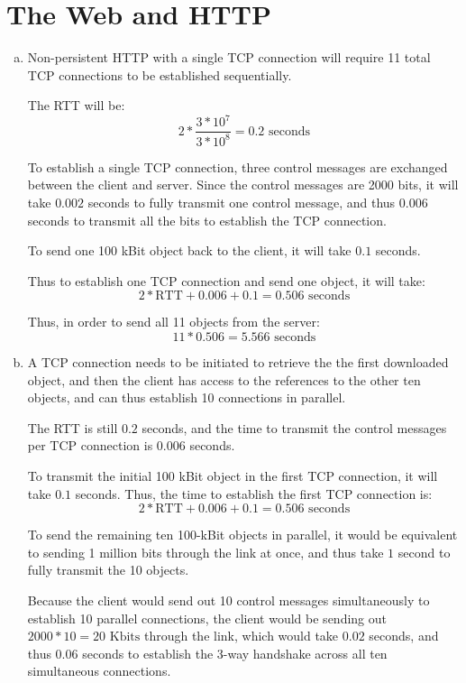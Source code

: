 \documentclass[11pt]{article}
\begin{document}
\section*{The Web and HTTP}
  \begin{enumerate}[(a)]
    \item
      Non-persistent HTTP with a single TCP connection will require 11 total
      TCP connections to be established sequentially.

      The RTT will be:
      \[ 2 * \frac{3 * 10^7}{3 * 10^8} = 0.2 \text{ seconds} \]

      To establish a single TCP connection, three control messages are exchanged
      between the client and server. Since the control messages are 2000 bits,
      it will take $0.002$ seconds to fully transmit one control message, and thus
      $0.006$ seconds to transmit all the bits to establish the TCP connection.

      To send one 100 kBit object back to the client, it will take $0.1$ seconds.

      Thus to establish one TCP connection and send one object, it will take:
      \[ 2 * \text{RTT} + 0.006 + 0.1 = 0.506 \text{ seconds} \]

      Thus, in order to send all 11 objects from the server:
      \[ 11 * 0.506 = \boxed{5.566 \text{ seconds}} \]
    \item
      A TCP connection needs to be initiated to retrieve the the first downloaded
      object, and then the client has access to the references to the other ten
      objects, and can thus establish 10 connections in parallel.

      The RTT is still $0.2$ seconds, and the time to transmit the control messages
      per TCP connection is $0.006$ seconds.

      To transmit the initial 100 kBit object in the first TCP connection, it will take
      $0.1$ seconds. Thus, the time to establish the first TCP connection is:
      \[ 2 * \text{RTT} + 0.006 + 0.1 = 0.506 \text{ seconds} \]

      To send the remaining ten 100-kBit objects in parallel, it would be equivalent
      to sending 1 million bits through the link at once, and thus take $1$ second
      to fully transmit the 10 objects.

      Because the client would send out 10 control messages simultaneously to
      establish 10 parallel connections, the client would be sending out
      $2000 * 10 = 20 \text{ Kbits}$ through the link, which would take
      $0.02$ seconds, and thus $0.06$ seconds to establish the 3-way handshake
      across all ten simultaneous connections.


\end{enumerate}
\end{document}
